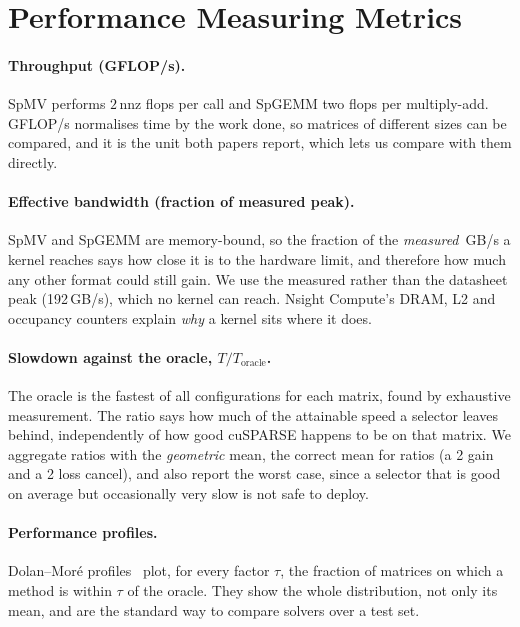 \section{Performance Measuring Metrics}\label{sec:metrics}

\paragraph{Throughput (GFLOP/s).} SpMV performs $2\,\mathrm{nnz}$ flops per call and SpGEMM two flops per
multiply-add. GFLOP/s normalises time by the work done, so matrices of different sizes can be compared, and it is the
unit both papers report, which lets us compare with them directly.

\paragraph{Effective bandwidth (fraction of measured peak).} SpMV and SpGEMM are memory-bound, so the fraction of the
\emph{measured} \,GB/s a kernel reaches says how close it is to the hardware limit, and therefore
how much any other format could still gain. We use the measured rather than the datasheet peak (192\,GB/s), which no
kernel can reach. Nsight Compute's DRAM, L2 and occupancy counters explain \emph{why} a kernel sits where it does.

\paragraph{Slowdown against the oracle, $T/T_\text{oracle}$.} The oracle is the fastest of all configurations for
each matrix, found by exhaustive measurement. The ratio says how much of the attainable speed a selector leaves
behind, independently of how good cuSPARSE happens to be on that matrix. We aggregate ratios with the \emph{geometric}
mean, the correct mean for ratios (a 2\x{} gain and a 2\x{} loss cancel), and also report the worst case, since a
selector that is good on average but occasionally very slow is not safe to deploy.

\paragraph{Performance profiles.} Dolan--Mor\'e profiles~\cite{dolan2002profiles} plot, for every factor $\tau$, the
fraction of matrices on which a method is within $\tau$ of the oracle. They show the whole distribution, not only its
mean, and are the standard way to compare solvers over a test set.

